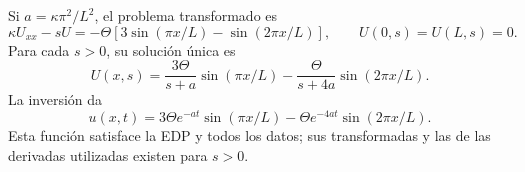 Si \(a=\kappa\pi^2/L^2\), el problema transformado es
\[
\kappa U_{xx}-sU=-\Theta\left[3\sin(\pi x/L)-\sin(2\pi x/L)\right],
\qquad U(0,s)=U(L,s)=0.
\]
Para cada \(s>0\), su solución única es
\[
U(x,s)=\frac{3\Theta}{s+a}\sin(\pi x/L)
-\frac{\Theta}{s+4a}\sin(2\pi x/L).
\]
La inversión da
\[
u(x,t)=3\Theta e^{-at}\sin(\pi x/L)
-\Theta e^{-4at}\sin(2\pi x/L).
\]
Esta función satisface la EDP y todos los datos; sus transformadas y las de las derivadas utilizadas existen para \(s>0\).
